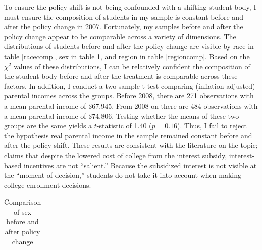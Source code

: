 \documentclass[12pt]{article}
\begin{document}
	To ensure the policy shift is not being confounded with a shifting student body, I must ensure the composition of students in my sample is constant before and after the policy change in 2007. Fortunately, my samples before and after the policy change appear to be comparable across a variety of dimensions. The distributions of students before and after the policy change are visible by race in table \ref{racecomp}, sex in table \ref{sexcomp}, and region in table \ref{regioncomp}. Based on the $\chi^2$ values of these distributions, I can be relatively confident the composition of the student body before and after the treatment is comparable across these factors. In addition, I conduct a two-sample t-test comparing (inflation-adjusted) parental incomes across the groups. Before 2008, there are 271 observations with a mean parental income of \$67,945. From 2008 on there are 484 observations with a mean parental income of \$74,806. Testing whether the means of these two groups are the same yields a $t$-statistic of 1.40 ($p = 0.16$). Thus, I fail to reject the hypothesis real parental income in the sample remained constant before and after the policy shift. These results are consistent with the literature on the topic; \textcite{dynarski2015} claims that despite the lowered cost of college from the interest subsidy, interest-based incentives are not ``salient.'' Because the subsidized interest is not visible at the ``moment of decision,'' students do not take it into account when making college enrollment decisions. 
	
{
	\begin{table}
		\centering
		\caption{Comparison of race before and after policy change}
		\label{racecomp}
	\end{table}

	\begin{table}
		\small
		\centering
		\caption{Comparison of sex before and after policy change}
		\begin{tabular}{lrrrrrr}
			
		\end{tabular}
		\label{sexcomp}
	\end{table}

	\begin{table}
		\centering
		\caption{Comparison of region before and after policy change}
		\label{regioncomp}
	\end{table}
}
	
\end{document}
